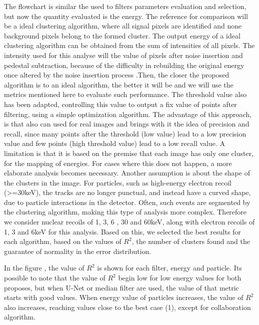 \documentclass[
        oneside,      %
        english,			
        brazil			 
        ]{abntbibufjf}
\begin{document}
The flowchart is similar the used to filters parameters evaluation and selection, but now the quantity evaluated is the energy. The reference for comparison will be a ideal clustering algorithm, where all signal pixels are identified and none background pixels belong to the formed cluster. The output energy of a ideal clustering algorithm can be obtained from the sum of intensities of all pixels. The intensity used for this analyse will the value of pixels after noise insertion and pedestal subtraction, because of the difficulty in rebuilding the original energy once altered by the noise insertion process .Then, the closer the proposed algorithm is to an ideal algorithm, the better it will be and we will use the metrics mentioned here to evaluate such performance. The threshold value also has been adapted, controlling this value to output a fix value of points after filtering, using a simple optimization algorithm. The advantage of this approach, is that also can used for real images and brings with it the idea of precision and recall, since many points after the threshold (low value) lead to a low precision value and few points (high threshold value) lead to a low recall value. A limitation is that it is based on the premise that each image has only one cluster, for the mapping of energies. For cases where this does not happen, a more elaborate analysis becomes necessary. Another assumption is about the shape of the clusters in the image. For particles, such as high-energy electron recoil (>=30keV), the tracks are no longer punctual, and instead have a curved shape, due to particle interactions in the detector. Often, such events are segmented by the clustering algorithm, making this type of analysis more complex. Therefore we consider nuclear recoils of 1, 3, 6 , 30 and 60keV, along with electron recoils of 1, 3 and 6keV for this analysis. Based on this, we selected the best results for each algorithm, based on the values of $R^{2}$, the number of clusters found and the guarantee of normality in the error distribution.


In the figure \label{r_square_result}, the value of $R^{2}$ is shown for each filter, energy and particle. Its possible to note that the value of $R^{2}$ begin low for low energy values for both proposes, but when U-Net or median filter are used, the value of that metric starts with good values. When energy value of particles increases, the value of $R^{2}$ also increases, reaching values close to the best case (1), except for collaboration algorithm.
\end{document}
